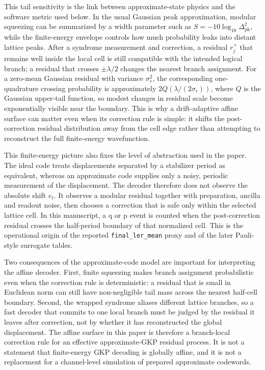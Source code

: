 \documentclass[11pt]{article}
\newcommand{\finalLER}{\texttt{final\_ler\_mean}}
\begin{document}
This tail sensitivity is the link between approximate-state physics and the
software metric used below.  In the usual Gaussian peak approximation, modular
squeezing can be summarized by a width parameter such as
\(S=-10\log_{10}\Delta_{\mathrm{pk}}^2\), while the finite-energy envelope
controls how much probability leaks into distant lattice peaks.  After a
syndrome measurement and correction, a residual \(r_j^+\) that remains well
inside the local cell is still compatible with the intended logical branch; a
residual that crosses \(\pm\lambda/2\) changes the nearest branch assignment.
For a zero-mean Gaussian residual with variance \(\sigma_r^2\), the corresponding
one-quadrature crossing probability is approximately
\(2Q(\lambda/(2\sigma_r))\), where \(Q\) is the Gaussian upper-tail function,
so modest changes in residual scale become
exponentially visible near the boundary.  This is why a drift-adaptive affine
surface can matter even when its correction rule is simple: it shifts the
post-correction residual distribution away from the cell edge rather than
attempting to reconstruct the full finite-energy wavefunction.

This finite-energy picture also fixes the level of abstraction used in the
paper.  The ideal code treats displacements separated by a stabilizer period as
equivalent, whereas an approximate code supplies only a noisy, periodic
measurement of the displacement.  The decoder therefore does not observe the
absolute shift \(e_t\).  It observes a modular residual together with
preparation, ancilla and readout noise, then chooses a correction that is safe
only within the selected lattice cell.  In this manuscript, a q or p event is
counted when the post-correction residual crosses the half-period boundary of
that normalized cell.  This is the operational origin of the reported
\finalLER{} proxy and of the later Pauli-style surrogate tables.

Two consequences of the approximate-code model are important for interpreting
the affine decoder.  First, finite squeezing makes branch assignment
probabilistic even when the correction rule is deterministic: a residual that is
small in Euclidean norm can still have non-negligible tail mass across the
nearest half-cell boundary.  Second, the wrapped syndrome aliases different
lattice branches, so a fast decoder that commits to one local branch must be
judged by the residual it leaves after correction, not by whether it has
reconstructed the global displacement.  The affine surface in this paper is
therefore a branch-local correction rule for an effective approximate-GKP
residual process.  It is not a statement that finite-energy GKP decoding is
globally affine, and it is not a replacement for a channel-level simulation of
prepared approximate codewords.
\end{document}
